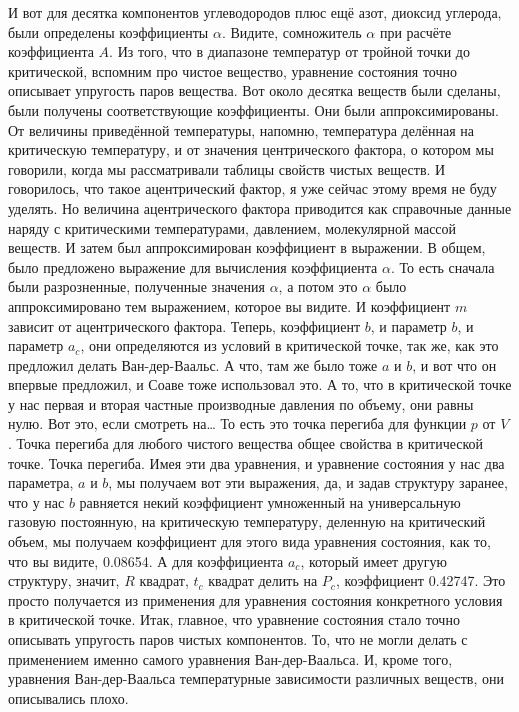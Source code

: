\documentclass[main.tex]{subfiles}
\begin{document}
И вот для десятка компонентов углеводородов плюс ещё азот, диоксид углерода, были определены коэффициенты $\alpha$.
Видите, сомножитель $\alpha$ при расчёте коэффициента $A$.
Из того, что в диапазоне температур от тройной точки до критической, вспомним про чистое вещество, уравнение состояния точно описывает упругость паров вещества.
Вот около десятка веществ были сделаны, были получены соответствующие коэффициенты.
Они были аппроксимированы.
От величины приведённой температуры, напомню, температура делённая на критическую температуру,
и от значения центрического фактора, о котором мы говорили, когда мы рассматривали таблицы свойств чистых веществ.
И говорилось, что такое ацентрический фактор, я уже сейчас этому время не буду уделять.
Но величина ацентрического фактора приводится как справочные данные наряду с критическими температурами, давлением, молекулярной массой веществ.
И затем был аппроксимирован коэффициент в выражении.
В общем, было предложено выражение для вычисления коэффициента $\alpha$.
То есть сначала были разрозненные, полученные значения $\alpha$, а потом это $\alpha$ было аппроксимировано тем выражением, которое вы видите.
И коэффициент $m$ зависит от ацентрического фактора.
Теперь, коэффициент $b$, и параметр $b$, и параметр $a_c$, они определяются из условий в критической точке, так же, как это предложил делать Ван-дер-Ваальс.
А что, там же было тоже $a$ и $b$, и вот что он впервые предложил, и Соаве тоже использовал это.
А то, что в критической точке у нас первая и вторая частные производные давления по объему, они равны нулю.
Вот это, если смотреть на…
То есть это точка перегиба для функции $p$ от $V$.
Точка перегиба для любого чистого вещества общее свойства в критической точке.
Точка перегиба.
Имея эти два уравнения, и уравнение состояния у нас два параметра, $a$ и $b$, мы получаем вот эти выражения, да, и задав структуру заранее, что у нас $b$ равняется некий коэффициент умноженный на универсальную газовую постоянную, на критическую температуру, деленную на критический объем, мы получаем коэффициент для этого вида уравнения состояния, как то, что вы видите, 0.08654.
А для коэффициента $a_c$, который имеет другую структуру, значит, $R$ квадрат, $t_c$ квадрат делить на $P_c$, коэффициент 0.42747.
Это просто получается из применения для уравнения состояния конкретного условия в критической точке.
Итак, главное, что уравнение состояния стало точно описывать упругость паров чистых компонентов.
То, что не могли делать с применением именно самого уравнения Ван-дер-Ваальса.
И, кроме того, уравнения Ван-дер-Ваальса температурные зависимости различных веществ, они описывались плохо.
\end{document}
